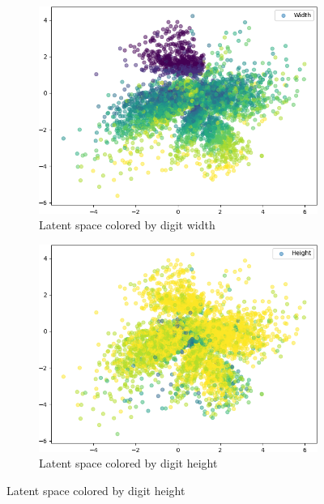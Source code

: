 \begin{figure}[H]
\begin{subfigure}{.24\textwidth}
        \label{subfig:vae_mnist_latent_space_length}
    \end{subfigure}
    \hfill
    \begin{subfigure}{.24\textwidth}
        \includegraphics[width=\textwidth]{images/latent_spaces/mnist/vae_gan/embeddings_mu_4.png}
        \caption{Latent space colored by digit width}
        \label{subfig:vae_mnist_latent_space_width}
    \end{subfigure}
    \hfill
    \begin{subfigure}{.24\textwidth}
        \includegraphics[width=\textwidth]{images/latent_spaces/mnist/vae_gan/embeddings_mu_5.png}
        \caption{Latent space colored by digit height}
        \label{subfig:vae_mnist_latent_space_height}

\end{subfigure}
\end{figure}
